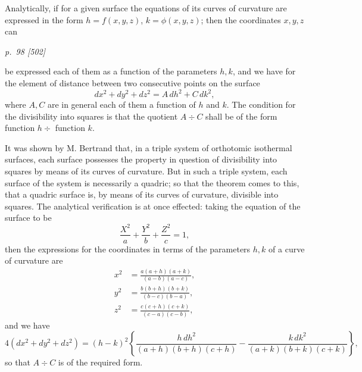 \documentclass[11pt,a4paper]{article}
\newcommand{\sourcepage}[2]{%
  \bigskip
  \noindent\textit{p.~#1 [#2]}%
  \par\smallskip
}
\begin{document}
\begin{center}
\end{center}

Analytically, if for a given surface the equations of its curves of curvature are
expressed in the form $h=f(x,y,z)$, $k=\phi(x,y,z)$; then the coordinates
$x,y,z$ can

\sourcepage{98}{502}
be expressed each of them as a function of the parameters $h,k$, and we have for
the element of distance between two consecutive points on the surface
\[
dx^2+dy^2+dz^2=A\,dh^2+C\,dk^2,
\]
where $A,C$ are in general each of them a function of $h$ and $k$. The condition
for the divisibility into squares is that the quotient $A\div C$ shall be of the form
function $h\div$ function $k$.

It was shown by M. Bertrand that, in a triple system of orthotomic isothermal
surfaces, each surface possesses the property in question of divisibility into squares
by means of its curves of curvature. But in such a triple system, each surface of
the system is necessarily a quadric; so that the theorem comes to this, that a
quadric surface is, by means of its curves of curvature, divisible into squares. The
analytical verification is at once effected: taking the equation of the surface to be
\[
\frac{X^2}{a}+\frac{Y^2}{b}+\frac{Z^2}{c}=1,
\]
then the expressions for the coordinates in terms of the parameters $h,k$ of a
curve of curvature are
\[
\begin{aligned}
x^2&=\frac{a(a+h)(a+k)}{(a-b)(a-c)},\\
y^2&=\frac{b(b+h)(b+k)}{(b-c)(b-a)},\\
z^2&=\frac{c(c+h)(c+k)}{(c-a)(c-b)},
\end{aligned}
\]
and we have
\[
4(dx^2+dy^2+dz^2)
=(h-k)^2\left\{
\frac{h\,dh^2}{(a+h)(b+h)(c+h)}
-\frac{k\,dk^2}{(a+k)(b+k)(c+k)}
\right\},
\]
so that $A\div C$ is of the required form.
\end{document}
